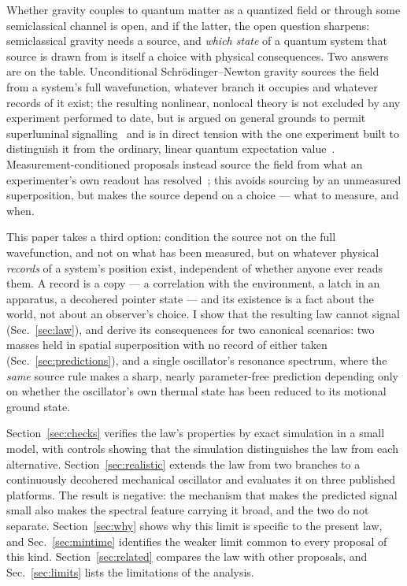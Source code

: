 \documentclass[aps,pra,reprint,amsmath,amssymb,superscriptaddress]{revtex4-2}
\begin{document}
Whether gravity couples to quantum matter as a quantized field or through some
semiclassical channel is open, and if the latter, the open question sharpens:
semiclassical gravity needs a source, and \emph{which state} of a quantum
system that source is drawn from is itself a choice with physical
consequences. Two answers are on the table. Unconditional
Schr\"odinger--Newton gravity sources the field from a system's full
wavefunction, whatever branch it occupies and whatever records of it exist;
the resulting nonlinear, nonlocal theory is not excluded by any experiment
performed to date, but is argued on general grounds to permit
superluminal signalling~\cite{EppleyHannah1977} and is in direct tension with
the one experiment built to distinguish it from the ordinary, linear quantum
expectation value~\cite{PageGeilker1981}. Measurement-conditioned proposals
instead source the field from what an experimenter's own readout has
resolved~\cite{Yang2013,Helou2017,LiuEtAl2023}; this avoids sourcing
by an unmeasured superposition, but makes the source depend on a choice --- what to measure, and when.

This paper takes a third option: condition the source not on the full
wavefunction, and not on what has been measured, but on whatever physical
\emph{records} of a system's position exist, independent of whether anyone
ever reads them. A record is a copy --- a correlation with the environment, a
latch in an apparatus, a decohered pointer state --- and its existence is a
fact about the world, not about an observer's choice. I show that the
resulting law cannot signal (Sec.~\ref{sec:law}), and derive its
consequences for two
canonical scenarios: two masses held in spatial superposition with no record
of either taken (Sec.~\ref{sec:predictions}), and a single oscillator's
resonance spectrum, where the \emph{same} source rule makes a sharp,
nearly parameter-free prediction depending only on whether the oscillator's
own thermal state has been reduced to its motional ground state.

Section~\ref{sec:checks} verifies the law's properties by exact simulation in
a small model, with controls showing that the simulation distinguishes the law
from each alternative. Section~\ref{sec:realistic} extends the law from two
branches to a continuously decohered mechanical oscillator and evaluates it on
three published platforms. The result is negative: the mechanism that makes
the predicted signal small also makes the spectral feature carrying it broad,
and the two do not separate. Section~\ref{sec:why} shows why this limit is
specific to the present law, and Sec.~\ref{sec:mintime} identifies the weaker
limit common to every proposal of this kind. Section~\ref{sec:related}
compares the law with other proposals, and Sec.~\ref{sec:limits} lists the
limitations of the analysis.
\end{document}
